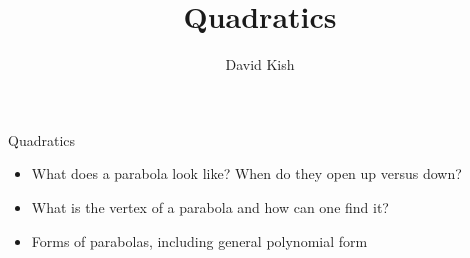\documentclass{ximera}
\author{David Kish}
\title{Quadratics}
\begin{document}
\begin{abstract}
\end{abstract}
\maketitle


\begin{objectives}

\item Quadratics
\begin{itemize}
	\item What does a parabola look like?  When do they open up versus down?
	\item What is the vertex of a parabola and how can one find it?
	\item Forms of parabolas, including general polynomial form
\end{itemize}

\end{objectives}
\end{document}
